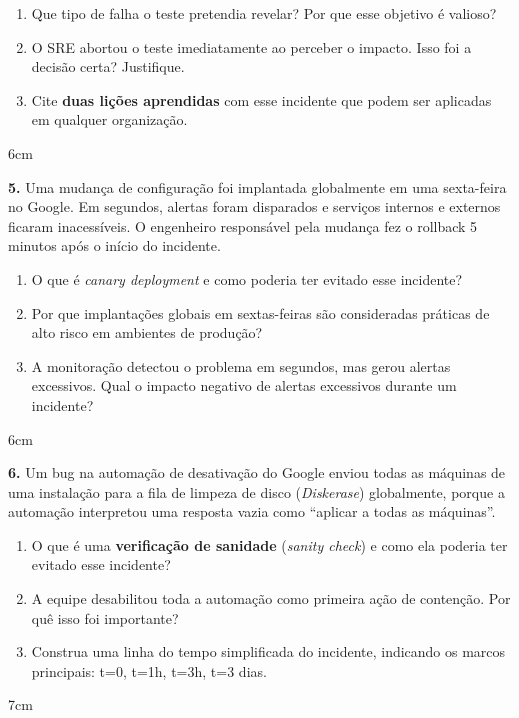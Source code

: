 \documentclass[12pt,a4paper,twoside]{report}
\begin{document}
\begin{enumerate}[label=\alph*)]
  \item Que tipo de falha o teste pretendia revelar? Por que esse objetivo é valioso?
  \item O SRE abortou o teste imediatamente ao perceber o impacto. Isso foi a decisão
        certa? Justifique.
  \item Cite \textbf{duas lições aprendidas} com esse incidente que podem ser aplicadas
        em qualquer organização.
\end{enumerate}
\begin{resposta}{6cm}
\end{resposta}

\vspace{0.5cm}

\textbf{5.} Uma mudança de configuração foi implantada globalmente em uma sexta-feira
no Google. Em segundos, alertas foram disparados e serviços internos e externos ficaram
inacessíveis. O engenheiro responsável pela mudança fez o rollback 5 minutos após o
início do incidente.

\begin{enumerate}[label=\alph*)]
  \item O que é \textit{canary deployment} e como poderia ter evitado esse incidente?
  \item Por que implantações globais em sextas-feiras são consideradas práticas de
        alto risco em ambientes de produção?
  \item A monitoração detectou o problema em segundos, mas gerou alertas excessivos.
        Qual o impacto negativo de alertas excessivos durante um incidente?
\end{enumerate}
\begin{resposta}{6cm}
\end{resposta}

\vspace{0.5cm}

\textbf{6.} Um bug na automação de desativação do Google enviou todas as máquinas de
uma instalação para a fila de limpeza de disco (\textit{Diskerase}) globalmente, porque a
automação interpretou uma resposta vazia como ``aplicar a todas as máquinas''.

\begin{enumerate}[label=\alph*)]
  \item O que é uma \textbf{verificação de sanidade} (\textit{sanity check}) e como ela
        poderia ter evitado esse incidente?
  \item A equipe desabilitou toda a automação como primeira ação de contenção. Por quê
        isso foi importante?
  \item Construa uma linha do tempo simplificada do incidente, indicando os marcos
        principais: t=0, t=1h, t=3h, t=3 dias.
\end{enumerate}
\begin{resposta}{7cm}
\end{resposta}
\end{document}
